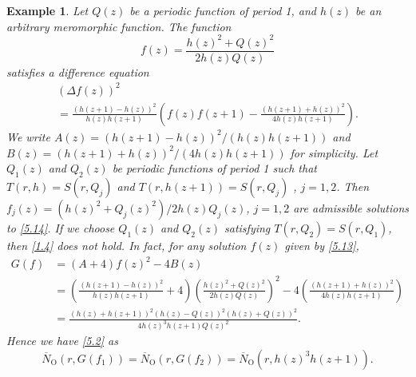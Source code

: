 \documentclass{amsart}
\newtheorem{example}[theorem]{Example}
\begin{document}
\begin{example}\label{ex5.1} Let $Q(z)$ be a periodic function of period 1, and $h(z)$ be an
arbitrary meromorphic function.
The function
\begin{equation}
f(z)=\frac{h(z)^2+Q(z)^2}{2h(z)Q(z)}\label{5.13}
\end{equation}
satisfies a difference equation
\begin{multline}
(\Delta f(z))^2\\
=\frac{(h(z+1)-h(z))^2}{h(z)h(z+1)}\left(f(z)f(z+1)-\frac{(h(z+1)+h(z))^2}{4h(z)h(z+1)}\right).\label{5.14}
\end{multline}
We write $A(z)=(h(z+1)-h(z))^2/(h(z)h(z+1))$ and $B(z)=(h(z+1)+h(z))^2/(4h(z)h(z+1))$ for simplicity. Let $Q_1(z)$ and $Q_2(z)$ be periodic functions of period 1 such that
$T(r,h)=S(r,Q_j)$ and $T(r,h(z+1))=S(r,Q_j)$ , $j=1, 2$. Then $f_j(z)=(h(z)^2+Q_j(z)^2)/2h(z)Q_j(z)$, $j=1, 2$ are admissible solutions to \eqref{5.14}. If we choose $Q_1(z)$ and $Q_2(z)$ satisfying $T(r,Q_2)=S(r,Q_1)$, then \eqref{1.4} does not hold. In fact, for any solution $f(z)$ given by \eqref{5.13},
\begin{align*}
G(f)&=(A+4)f(z)^2-4B(z)\\
&=\left(\frac{(h(z+1)-h(z))^2}{h(z)h(z+1)}+4\right)\left(\frac{h(z)^2+Q(z)^2}{2h(z)Q(z)}\right)^2-4\left(\frac{(h(z+1)+h(z))^2}{4h(z)h(z+1)}\right)\\
&=\frac{(h(z)+h(z+1))^2(h(z)-Q(z))^2(h(z)+Q(z))^2}{4h(z)^3h(z+1)Q(z)^2}.
\end{align*}
Hence we have \eqref{5.2} as
\begin{equation*}
\overline N_{\text{O}}(r,G(f_1))=\overline N_{\text{O}}(r,G(f_2))=\overline N_{\text{O}}(r,h(z)^3h(z+1)).
\end{equation*}
\end{example}







%
%
\end{document}
